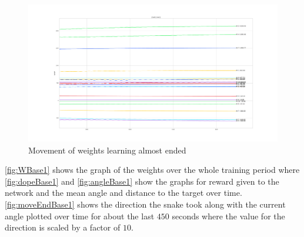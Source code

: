 \begin{figure}[htpb]
  \centering
  \includegraphics[width=\textwidth]{figures/plots/endWBase1}
  \caption{Movement of weights learning almost ended }
  \label{fig:endWBase1}
\end{figure}
\autoref{fig:WBase1} shows the graph of the weights over the whole training period where \autoref{fig:dopeBase1} and \autoref{fig:angleBase1} show the graphs for reward given to the network and the mean angle and distance to the target over time. \autoref{fig:moveEndBase1} shows the direction the snake took along with the current angle plotted over time for about the last $450$ seconds where the value for the direction is scaled by a factor of $10$.

